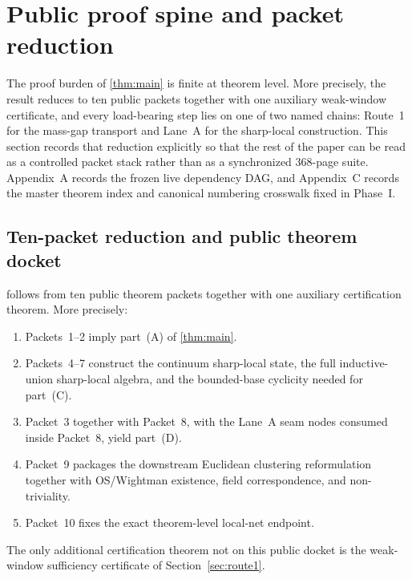 \section{Public proof spine and packet reduction}\label{sec:packet-reduction}

The proof burden of \cref{thm:main} is finite at theorem level. More precisely, the result reduces to ten public packets together with one auxiliary weak-window certificate, and every load-bearing step lies on one of two named chains: Route~1 for the mass-gap transport and Lane~A for the sharp-local construction. This section records that reduction explicitly so that the rest of the paper can be read as a controlled packet stack rather than as a synchronized 368-page suite. Appendix~A records the frozen live dependency DAG, and Appendix~C records the master theorem index and canonical numbering crosswalk fixed in Phase~I.

\subsection{Ten-packet reduction and public theorem docket}

\begin{proposition}\label{prop:packet-reduction}
 follows from ten public theorem packets together with one auxiliary certification theorem. More precisely:
\begin{enumerate}[label=\textup{(\roman*)}]
    \item Packets~1--2 imply part~\textup{(A)} of \cref{thm:main}.
    \item Packets~4--7 construct the continuum sharp-local state, the full inductive-union sharp-local algebra, and the bounded-base cyclicity needed for part~\textup{(C)}.
    \item Packet~3 together with Packet~8, with the Lane~A seam nodes consumed inside Packet~8, yield part~\textup{(D)}.
    \item Packet~9 packages the downstream Euclidean clustering reformulation together with OS/Wightman existence, field correspondence, and non-triviality.
    \item Packet~10 fixes the exact theorem-level local-net endpoint.
\end{enumerate}
The only additional certification theorem not on this public docket is the weak-window sufficiency certificate of Section~\ref{sec:route1}.
\end{proposition}

